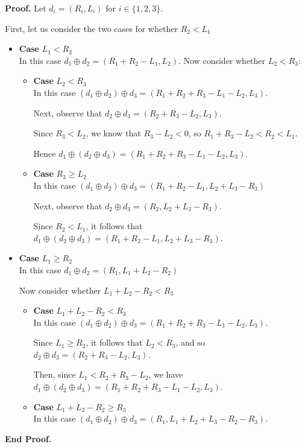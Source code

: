 \documentclass{article}
\newcommand{\combine}[2]{{#1} \oplus {#2}}
\newcommand{\setof}[1]{\{{#1}\}}
\newenvironment{proof}{\noindent\textbf{Proof.}}{\noindent\textbf{End Proof.}}
\newenvironment{caseblock}{\begin{itemize}}{\end{itemize}}
\newenvironment{case}[1]{\item \textbf{Case} {#1}\\}{}
\begin{document}
\begin{proof}
  Let $d_i = (R_i, L_i)$ for $i \in \setof{1,2,3}$. 

  First, let us consider the two cases for whether $R_2 < L_1$
  \begin{caseblock}
    \begin{case}{$L_1 < R_2$}
      In this case $\combine{d_1}{d_2} = (R_1 + R_2 - L_1, L_2)$. 
      Now consider whether $L_2 < R_3$: 
      \begin{caseblock}
        \begin{case}{$L_2 < R_3$}
          In this case $\combine{(\combine{d_1}{d_2})}{d_3} = (R_1 + R_2 + R_3 - L_1 - L_2, L_3)$. 

          Next, observe that $\combine{d_2}{d_3} = (R_2 + R_3 - L_2, L_3)$. 

          Since $R_3 < L_2$,  we know that $R_3 - L_2 < 0$, so $R_1 + R_3 - L_2 < R_2 < L_1$.  
          
          Hence $\combine{d_1}{(\combine{d_2}{d_3})} = (R_1 + R_2 + R_3 - L_1 - L_2, L_3)$. 
        \end{case}

        \begin{case}{$R_3 \geq L_2$}
          In this case $\combine{(\combine{d_1}{d_2})}{d_3} = (R_1 + R_2 - L_1,  L_2 + L_3 - R_3)$
          
          Next, observe that $\combine{d_2}{d_3} = (R_2, L_2 + L_3 - R_3)$. 

          Since $R_2 < L_1$, it follows that $\combine{d_1}{(\combine{d_2}{d_3})} = (R_1 + R_2 - L_1, L_2 + L_3 - R_3)$. 
        \end{case}
      \end{caseblock}
    \end{case}

    \begin{case}{$L_1\geq R_2$}
      In this case $\combine{d_1}{d_2} = (R_1, L_1 + L_2 - R_2)$

      Now consider whether $L_1 + L_2 - R_2 < R_3$
      \begin{caseblock}
        \begin{case}{$L_1 + L_2 - R_2 < R_3$}
          In this case $\combine{(\combine{d_1}{d_2})}{d_3} = (R_1 + R_2 + R_3 - L_1 - L_2, L_3)$. 

          Since $L_1 \geq R_2$, it follows that $L_2 < R_3$, and so $\combine{d_2}{d_3} = (R_2 + R_3 - L_2, L_3)$. 

          Then, since $L_1 < R_2 + R_3 - L_2$, we have $\combine{d_1}{(\combine{d_2}{d_3})} = (R_1 + R_2 + R_3 - L_1 - L_2, L_3)$. 
        \end{case}

        \begin{case}{$L_1 + L_2 - R_2 \geq R_3$}
          In this case $\combine{(\combine{d_1}{d_2})}{d_3} = (R_1, L_1 + L_2 + L_3 - R_2 - R_3)$.
        \end{case}
      \end{caseblock}
    \end{case}
  \end{caseblock}
\end{proof}
\end{document}
